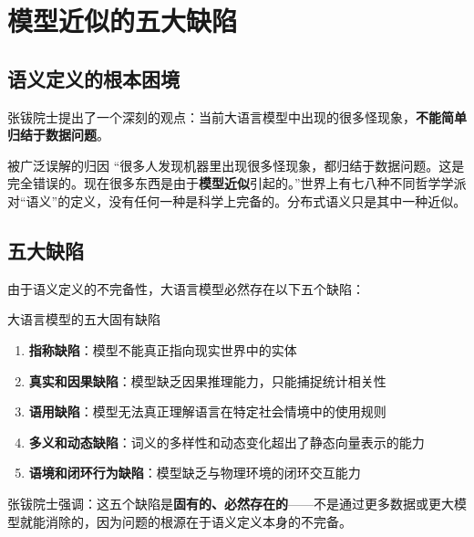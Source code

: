 \section{模型近似的五大缺陷}

\subsection{语义定义的根本困境}

张钹院士提出了一个深刻的观点：当前大语言模型中出现的很多怪现象，\textbf{不能简单归结于数据问题}。

\begin{warningbox}{被广泛误解的归因}
``很多人发现机器里出现很多怪现象，都归结于数据问题。这是完全错误的。现在很多东西是由于\textbf{模型近似}引起的。''世界上有七八种不同哲学学派对``语义''的定义，没有任何一种是科学上完备的。分布式语义只是其中一种近似。
\end{warningbox}

\subsection{五大缺陷}

由于语义定义的不完备性，大语言模型必然存在以下五个缺陷：

\begin{importantbox}{大语言模型的五大固有缺陷}
\begin{enumerate}
\item \textbf{指称缺陷}：模型不能真正指向现实世界中的实体
\item \textbf{真实和因果缺陷}：模型缺乏因果推理能力，只能捕捉统计相关性
\item \textbf{语用缺陷}：模型无法真正理解语言在特定社会情境中的使用规则
\item \textbf{多义和动态缺陷}：词义的多样性和动态变化超出了静态向量表示的能力
\item \textbf{语境和闭环行为缺陷}：模型缺乏与物理环境的闭环交互能力
\end{enumerate}
\end{importantbox}

张钹院士强调：这五个缺陷是\textbf{固有的、必然存在的}——不是通过更多数据或更大模型就能消除的，因为问题的根源在于语义定义本身的不完备。


